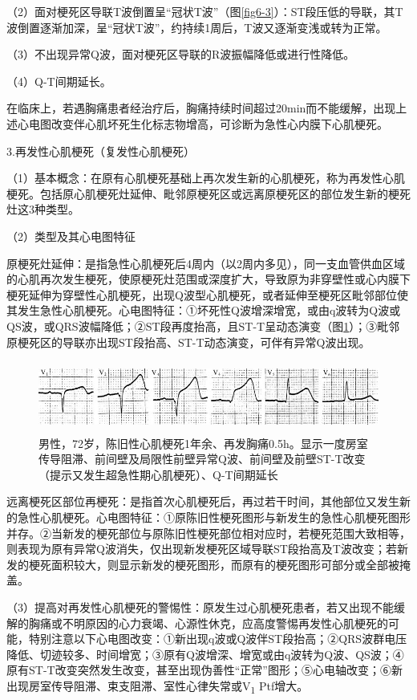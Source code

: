 （2）面对梗死区导联T波倒置呈“冠状T波”（图\ref{fig6-3}）：ST段压低的导联，其T波倒置逐渐加深，呈“冠状T波”，约持续1周后，T波又逐渐变浅或转为正常。

（3）不出现异常Q波，面对梗死区导联的R波振幅降低或进行性降低。

（4）Q-T间期延长。

在临床上，若遇胸痛患者经治疗后，胸痛持续时间超过20min而不能缓解，出现上述心电图改变伴心肌坏死生化标志物增高，可诊断为急性心内膜下心肌梗死。

3.再发性心肌梗死（复发性心肌梗死）

（1）基本概念：在原有心肌梗死基础上再次发生新的心肌梗死，称为再发性心肌梗死。包括原心肌梗死灶延伸、毗邻原梗死区或远离原梗死区的部位发生新的梗死灶这3种类型。

（2）类型及其心电图特征

原梗死灶延伸：是指急性心肌梗死后4周内（以2周内多见），同一支血管供血区域的心肌再次发生梗死，使原梗死灶范围或深度扩大，导致原为非穿壁性或心内膜下梗死延伸为穿壁性心肌梗死，出现Q波型心肌梗死，或者延伸至梗死区毗邻部位使其发生急性心肌梗死。心电图特征：①坏死性Q波增深增宽，或由q波转为Q波或QS波，或QRS波幅降低；②ST段再度抬高，且ST-T呈动态演变（图\ref{fig44-13}）；③毗邻原梗死区的导联亦出现ST段抬高、ST-T动态演变，可伴有异常Q波出现。

\begin{figure}[!htbp]
 \centering
 \includegraphics[width=5.58333in,height=0.91667in]{./images/Image00721.jpg}
 \captionsetup{justification=centering}
 \caption{男性，72岁，陈旧性心肌梗死1年余、再发胸痛0.5h。显示一度房室传导阻滞、前间壁及局限性前壁异常Q波、前间壁及前壁ST-T改变（提示又发生超急性期心肌梗死）、Q-T间期延长}
 \label{fig44-13}
  \end{figure} 

远离梗死区部位再梗死：是指首次心肌梗死后，再过若干时间，其他部位又发生新的急性心肌梗死。心电图特征：①原陈旧性梗死图形与新发生的急性心肌梗死图形并存。②当新发的梗死部位与原陈旧性梗死部位相对应时，若梗死范围大致相等，则表现为原有异常Q波消失，仅出现新发梗死区域导联ST段抬高及T波改变；若新发的梗死面积较大，则显示新发的梗死图形，而原有的梗死图形可部分或全部被掩盖。

（3）提高对再发性心肌梗死的警惕性：原发生过心肌梗死患者，若又出现不能缓解的胸痛或不明原因的心力衰竭、心源性休克，应高度警惕再发性心肌梗死的可能，特别注意以下心电图改变：①新出现q波或Q波伴ST段抬高；②QRS波群电压降低、切迹较多、时间增宽；③原有Q波增深、增宽或由q波转为Q波、QS波；④原有ST-T改变突然发生改变，甚至出现伪善性“正常”图形；⑤心电轴改变；⑥新出现房室传导阻滞、束支阻滞、室性心律失常或V\textsubscript{1}
Ptf增大。

